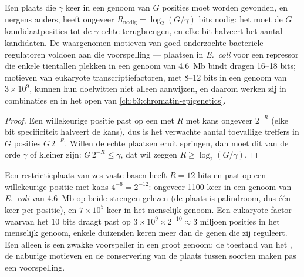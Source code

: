 \begin{proposition}\label{prop:b3:bioinformatics:bits}
Een plaats die $\gamma$ keer in een genoom van $G$ posities moet worden
gevonden, en nergens anders, heeft ongeveer
$R_{\text{nodig}} = \log_{2}(G/\gamma)$ bits  nodig:
het  moet de $G$ kandidaatposities tot de $\gamma$ echte
terugbrengen, en elke bit halveert het aantal kandidaten. De waargenomen
motieven van goed onderzochte bacteriële regulatoren voldoen aan die
voorspelling --- plaatsen in \emph{E.~coli} voor een repressor die
enkele tientallen plekken in een genoom van \qty{4.6}{Mb} bindt dragen
\numrange{16}{18} bits; motieven van eukaryote transcriptiefactoren,
met \numrange{8}{12} bits in een genoom van $3\times 10^{9}$, kunnen
hun doelwitten niet alleen aanwijzen, en daarom werken zij in
combinaties en in het open  van
\cref{ch:b3:chromatin-epigenetics}.
\end{proposition}
\begin{proof}
Een willekeurige positie past op een  met  $R$
met kans ongeveer $2^{-R}$ (elke bit specificiteit halveert de kans),
dus is het verwachte aantal toevallige treffers in $G$ posities
$G\,2^{-R}$. Willen de echte plaatsen eruit springen, dan moet dit van
de orde $\gamma$ of kleiner zijn: $G\,2^{-R} \le \gamma$, dat wil
zeggen $R \ge \log_{2}(G/\gamma)$.
\end{proof}

\begin{example}\label{ex:b3:bioinformatics:motif-numbers}
Een restrictieplaats van zes vaste basen heeft $R = 12$ bits en past op
een willekeurige positie met kans $4^{-6} = 2^{-12}$: ongeveer
\num{1100} keer in een genoom van \emph{E.~coli} van \qty{4.6}{Mb} op
beide strengen gelezen (de plaats is palindroom, dus één keer per
positie), en $7\times 10^{5}$ keer in het menselijk genoom. Een
eukaryote factor waarvan het  $10$ bits draagt past op
$3\times 10^{9}\times 2^{-10} \approx 3$ miljoen posities in het
menselijk genoom, enkele duizenden keren meer dan de genen die zij
reguleert. Een  alleen is een zwakke voorspeller in een groot
genoom; de toestand van het , de naburige motieven en de
conservering van de plaats tussen soorten maken pas een voorspelling.
\end{example}

